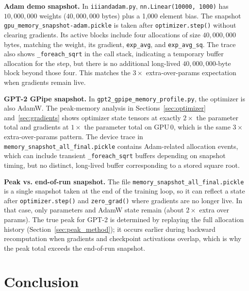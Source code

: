 \documentclass[11pt,a4paper]{article}
\begin{document}
\noindent\textbf{Adam demo snapshot.}
In \texttt{iiiandadam.py}, \texttt{nn.Linear(10000, 1000)} has $10{,}000{,}000$ weights
($40{,}000{,}000$ bytes) plus a 1,000 element bias. The snapshot
\texttt{gpu\_memory\_snapshot-adam.pickle} is taken after \texttt{optimizer.step()} without clearing gradients.
Its active blocks include four allocations of size $40{,}000{,}000$ bytes, matching
the weight, its gradient, \texttt{exp\_avg}, and \texttt{exp\_avg\_sq}. The trace also shows
\texttt{\_foreach\_sqrt} in the call stack, indicating a temporary buffer allocation for the
step, but there is no additional long-lived $40{,}000{,}000$-byte block beyond those four.
This matches the $3 \times$ extra-over-params expectation when gradients remain live.

\noindent\textbf{GPT-2 GPipe snapshot.}
In \texttt{gpt2\_gpipe\_memory\_profile.py}, the optimizer is also AdamW. The peak-memory analysis in
Sections~\ref{sec:optimizer} and~\ref{sec:gradients} shows optimizer state tensors at exactly
$2 \times$ the parameter total and gradients at $1 \times$ the parameter total on GPU\,0, which is
the same $3 \times$ extra-over-params pattern. The device trace in
\texttt{memory\_snapshot\_all\_final.pickle} contains Adam-related allocation events, which can
include transient \texttt{\_foreach\_sqrt} buffers depending on snapshot timing, but no distinct,
long-lived buffer corresponding to a stored square root.

\noindent\textbf{Peak vs. end-of-run snapshot.}
The file \texttt{memory\_snapshot\_all\_final.pickle} is a single snapshot taken at the end of the
training loop, so it can reflect a state after \texttt{optimizer.step()} and \texttt{zero\_grad()} where
gradients are no longer live. In that case, only parameters and AdamW state remain (about $2\times$
extra over params). The true peak for GPT-2 is determined by replaying the full allocation history
(Section~\ref{sec:peak_method}); it occurs earlier during backward recomputation when gradients and
checkpoint activations overlap, which is why the peak total exceeds the end-of-run snapshot.

\section{Conclusion}
\label{sec:conclusion}
\end{document}
